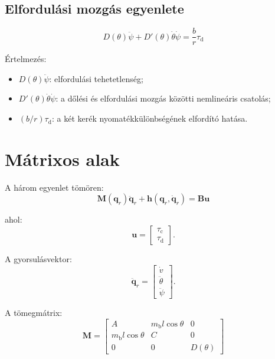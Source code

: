 \documentclass[12pt,a4paper]{article}
\newcommand{\mbody}{m_{\mathrm{b}}}
\newcommand{\tauc}{\tau_{\mathrm{c}}}
\newcommand{\taud}{\tau_{\mathrm{d}}}
\begin{document}
	\subsection{Elfordulási mozgás egyenlete}
	
	\begin{equation}
		\boxed{
			D(\theta)\ddot\psi
			+D'(\theta)\dot\theta\dot\psi
			=\frac{b}{r}\taud
		}
	\end{equation}
	
	Értelmezés:
	\begin{itemize}[leftmargin=2em]
		\item $D(\theta)\ddot\psi$: elfordulási tehetetlenség;
		\item $D'(\theta)\dot\theta\dot\psi$: a dőlési és elfordulási mozgás közötti nemlineáris csatolás;
		\item $(b/r)\taud$: a két kerék nyomatékkülönbségének elfordító hatása.
	\end{itemize}
	
	\section{Mátrixos alak}
	
	A három egyenlet tömören:
	\begin{equation}
		\boxed{
			\bm M(\bm q_r)\ddot{\bm q}_r
			+\bm h(\bm q_r,\dot{\bm q}_r)
			=\bm B\bm u
		}
	\end{equation}
	
	ahol:
	\begin{equation}
		\bm u=
		\begin{bmatrix}
			\tauc\\
			\taud
		\end{bmatrix}.
	\end{equation}
	
	A gyorsulásvektor:
	\begin{equation}
		\ddot{\bm q}_r=
		\begin{bmatrix}
			\dot v\\
			\ddot\theta\\
			\ddot\psi
		\end{bmatrix}.
	\end{equation}
	
	A tömegmátrix:
	\begin{equation}
		\boxed{
			\bm M=
			\begin{bmatrix}
				A & \mbody l\cos\theta & 0\\
				\mbody l\cos\theta & C & 0\\
				0 & 0 & D(\theta)
			\end{bmatrix}
		}
	\end{equation}
	
\end{document}
